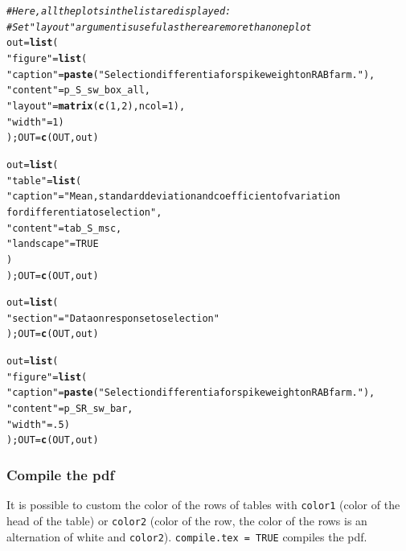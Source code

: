 \documentclass{article}\usepackage[]{graphicx}\usepackage[]{color}
\makeatletter
\newcommand{\hlnum}[1]{\textcolor[rgb]{0.686,0.059,0.569}{#1}}%
\newcommand{\hlstr}[1]{\textcolor[rgb]{0.192,0.494,0.8}{#1}}%
\newcommand{\hlcom}[1]{\textcolor[rgb]{0.678,0.584,0.686}{\textit{#1}}}%
\newcommand{\hlstd}[1]{\textcolor[rgb]{0.345,0.345,0.345}{#1}}%
\newcommand{\hlkwb}[1]{\textcolor[rgb]{0.69,0.353,0.396}{#1}}%
\newcommand{\hlkwc}[1]{\textcolor[rgb]{0.333,0.667,0.333}{#1}}%
\newcommand{\hlkwd}[1]{\textcolor[rgb]{0.737,0.353,0.396}{\textbf{#1}}}%
\newenvironment{kframe}{%
 \def\at@end@of@kframe{}%
 \ifinner\ifhmode%
  \def\at@end@of@kframe{\end{minipage}}%
  \begin{minipage}{\columnwidth}%
 \fi\fi%
 \def\FrameCommand##1{\hskip\@totalleftmargin \hskip-\fboxsep
 \colorbox{shadecolor}{##1}\hskip-\fboxsep
     \hskip-\linewidth \hskip-\@totalleftmargin \hskip\columnwidth}%
 \MakeFramed {\advance\hsize-\width
   \@totalleftmargin\z@ \linewidth\hsize
   \@setminipage}}%
 {\par\unskip\endMakeFramed%
 \at@end@of@kframe}
\newenvironment{knitrout}{}{} %
\makeatother
\begin{document}
\begin{knitrout}
\begin{kframe}
\begin{alltt}
\hlcom{# Here, all the plots in the list are displayed:}
\hlcom{# Set "layout" argument is useful as there are more than one plot}
\hlstd{out} \hlkwb{=} \hlkwd{list}\hlstd{(}
        \hlstr{"figure"} \hlstd{=} \hlkwd{list}\hlstd{(}
                \hlstr{"caption"} \hlstd{=} \hlkwd{paste}\hlstd{(}\hlstr{"Selection differentia for spike weight on RAB farm."}\hlstd{),}
                \hlstr{"content"} \hlstd{= p_S_sw_box_all,}
                \hlstr{"layout"} \hlstd{=} \hlkwd{matrix}\hlstd{(}\hlkwd{c}\hlstd{(}\hlnum{1}\hlstd{,}\hlnum{2}\hlstd{),} \hlkwc{ncol} \hlstd{=} \hlnum{1}\hlstd{),}
                \hlstr{"width"} \hlstd{=} \hlnum{1}\hlstd{)}
        \hlstd{); OUT} \hlkwb{=} \hlkwd{c}\hlstd{(OUT, out)}


\hlstd{out} \hlkwb{=} \hlkwd{list}\hlstd{(}
        \hlstr{"table"} \hlstd{=} \hlkwd{list}\hlstd{(}
                \hlstr{"caption"} \hlstd{=} \hlstr{"Mean, standard deviation and coefficient of variation 
		for differentia to selection"}\hlstd{,}
                \hlstr{"content"} \hlstd{= tab_S_msc,}
                \hlstr{"landscape"} \hlstd{=} \hlnum{TRUE}
                \hlstd{)}
        \hlstd{); OUT} \hlkwb{=} \hlkwd{c}\hlstd{(OUT, out)}

\hlstd{out} \hlkwb{=} \hlkwd{list}\hlstd{(}
        \hlstr{"section"} \hlstd{=} \hlstr{"Data on response to selection"}
        \hlstd{); OUT} \hlkwb{=} \hlkwd{c}\hlstd{(OUT, out)}

\hlstd{out} \hlkwb{=} \hlkwd{list}\hlstd{(}
        \hlstr{"figure"} \hlstd{=} \hlkwd{list}\hlstd{(}
                \hlstr{"caption"} \hlstd{=} \hlkwd{paste}\hlstd{(}\hlstr{"Selection differentia for spike weight on RAB farm."}\hlstd{),}
                \hlstr{"content"} \hlstd{= p_SR_sw_bar,}
                \hlstr{"width"} \hlstd{=} \hlnum{.5}\hlstd{)}
        \hlstd{); OUT} \hlkwb{=} \hlkwd{c}\hlstd{(OUT, out)}
\end{alltt}
\end{kframe}
\end{knitrout}


\subsubsection{Compile the pdf}

It is possible to custom the color of the rows of tables with \texttt{color1} (color of the head of the table) or \texttt{color2} (color of the row, the color of the rows is an alternation of white and \texttt{color2}).
\texttt{compile.tex = TRUE} compiles the pdf.
\end{document}
